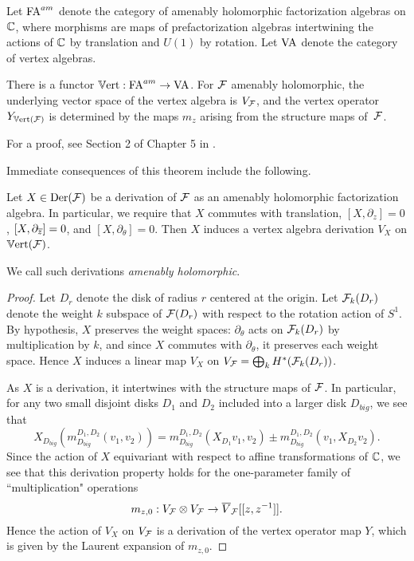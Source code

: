 Let ${\rm FA}^{am}$ denote the category of amenably holomorphic factorization algebras on $\mathbb C$,
where morphisms are maps of prefactorization algebras intertwining the actions of $\mathbb C$ by translation and $U(1)$ by rotation.
Let ${\rm VA}$ denote the category of vertex algebras.

\begin{thm}
\label{theorem_vertex_algebra}
There is a functor $\mathbb{V}{\rm ert}:{\rm FA}^{am} \to {\rm VA}$. 
For $\mathcal F$ amenably holomorphic, the underlying vector space of the vertex algebra is $V_\mathcal F$,
and the vertex operator $Y_{\mathbb{V}{\rm ert}(\mathcal F)}$ is determined by the maps $m_z$ arising from the structure maps of~$\mathcal F$.
\end{thm}

For a proof, see Section 2 of Chapter 5 in \cite{CG}.  

Immediate consequences of this theorem include the following.

\begin{lemma}\label{factder}
Let $X \in {\rm Der}(\mathcal F)$ be a derivation of $\mathcal F$ as an amenably holomorphic factorization algebra. In particular, we require that $X$ commutes with translation, $[X, \partial_z] = 0$, $[X, \partial_{\overline{z}}] = 0$, and $[X, \partial_\theta] = 0$. Then $X$ induces a vertex algebra derivation $V_X$ on $\mathbb{V}{\rm ert}(\mathcal F)$.
\end{lemma}

We call such derivations {\em amenably holomorphic}.

\begin{proof}
Let $D_r$ denote the disk of radius $r$ centered at the origin. 
Let $\mathcal F_k(D_r)$ denote the weight $k$ subspace of $\mathcal F(D_r)$ with respect to the rotation action of $S^1$. 
By hypothesis, $X$ preserves the weight spaces: $\partial_\theta$ acts on $\mathcal F_k(D_r)$ by multiplication by $k$, 
and since $X$ commutes with $\partial_\theta$, it preserves each weight space. 
Hence $X$ induces a linear map $V_X$ on $V_\mathcal F = \bigoplus_k H^*(\mathcal F_k(D_r))$. 

As $X$ is a derivation, it intertwines with the structure maps of $\mathcal F$. In particular, for any two small disjoint disks $D_1$ and $D_2$ included into a larger disk $D_{big}$, we see that 
\[
X_{D_{big}}(m^{D_1,D_2}_{D_{big}}(v_1, v_2)) = m^{D_1,D_2}_{D_{big}}(X_{D_1} v_1, v_2) \pm m^{D_1,D_2}_{D_{big}}(v_1, X_{D_2} v_2).
\]
Since the action of $X$ equivariant with respect to affine transformations of $\mathbb C$, we see that this derivation property holds for the one-parameter family of ``multiplication" operations 
\[
m_{z,0}: V_\mathcal F \otimes V_\mathcal F \to \overline{V}_\mathcal F[[z,z^{-1}]].
\]
Hence the action of $V_X$ on $V_\mathcal F$ is a derivation of the vertex operator map $Y$, which is given by the Laurent expansion of $m_{z,0}$. 
\end{proof}

